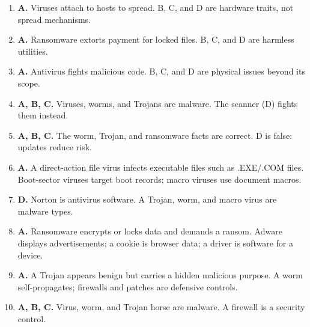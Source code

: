 \begin{enumerate}[label=\textbf{Q\arabic*.}, leftmargin=*]
\item \textbf{A.} Viruses attach to hosts to spread. B, C, and D are hardware traits, not spread mechanisms.
\item \textbf{A.} Ransomware extorts payment for locked files. B, C, and D are harmless utilities.
\item \textbf{A.} Antivirus fights malicious code. B, C, and D are physical issues beyond its scope.
\item \textbf{A, B, C.} Viruses, worms, and Trojans are malware. The scanner (D) fights them instead.
\item \textbf{A, B, C.} The worm, Trojan, and ransomware facts are correct. D is false: updates reduce risk.
\item \textbf{A.} A direct-action file virus infects executable files such as .EXE/.COM files. Boot-sector viruses target boot records; macro viruses use document macros.

\item \textbf{D.} Norton is antivirus software. A Trojan, worm, and macro virus are malware types.

\item \textbf{A.} Ransomware encrypts or locks data and demands a ransom. Adware displays advertisements; a cookie is browser data; a driver is software for a device.

\item \textbf{A.} A Trojan appears benign but carries a hidden malicious purpose. A worm self-propagates; firewalls and patches are defensive controls.

\item \textbf{A, B, C.} Virus, worm, and Trojan horse are malware. A firewall is a security control.

\end{enumerate}
